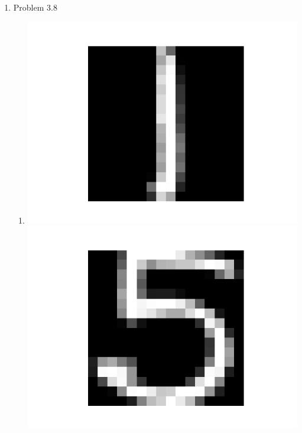 \documentclass{article}
\begin{document}
\begin{enumerate}
        \item Problem 3.8
        \begin{enumerate}[label=(\alph*)]
            \item \includegraphics[scale=0.5]{images/3_8_1.png}\\ \includegraphics[scale=0.5]{images/3_8_5.png}
        \end{enumerate}
    \end{enumerate}
\end{document}
